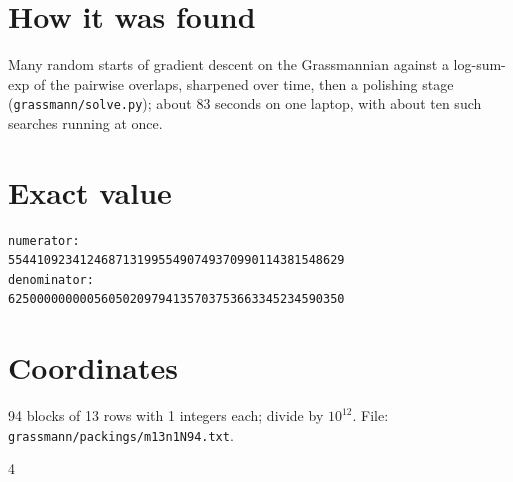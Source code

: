 \documentclass[11pt,a4paper]{article}
\begin{document}
\section{How it was found}
Many random starts of gradient descent on the Grassmannian against a log-sum-exp of the pairwise overlaps, sharpened over time, then a polishing stage (\texttt{grassmann/solve.py}); about 83 seconds on one laptop, with about ten such searches running at once.


\appendix
\section{Exact value}
{\small
\begin{verbatim}
numerator:
55441092341246871319955490749370990114381548629
denominator:
62500000000056050209794135703753663345234590350
\end{verbatim}}

\section{Coordinates}
94 blocks of 13 rows with 1 integers each; divide by $10^{12}$. File: \texttt{grassmann/packings/m13n1N94.txt}.
{\tiny
\begin{multicols}{4}
\end{multicols}}
\end{document}
